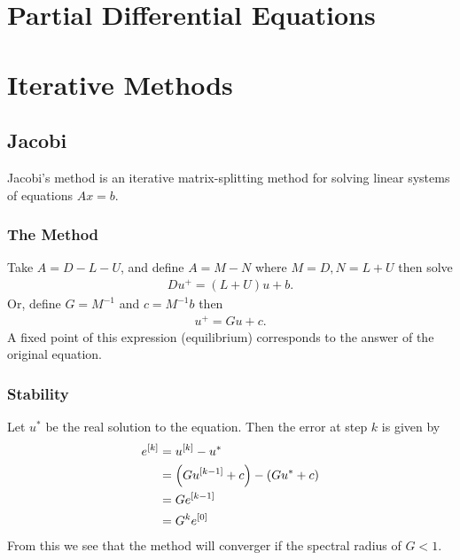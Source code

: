 

\tableofcontents
\section{Partial Differential Equations}
\section{Iterative Methods}
\subsection{Jacobi}
Jacobi's method is an iterative matrix-splitting method for solving linear systems of equations $Ax=b$.
\subsubsection{The Method}
Take $A = D-L-U$, and define $A = M-N$ where $M = D, N = L+U$ then solve
\begin{align}
  Du^+ =  (L+U)u +b.
\end{align}
Or, define $G = M^{-1}$ and $c = M^{-1}b$ then
\begin{align}
  u^+ = Gu+c.
\end{align}
A fixed point of this expression (equilibrium) corresponds to the answer of the original equation.
\subsubsection{Stability}
\label{sec:Jacobi_stab}
Let $u^*$ be the real solution to the equation. Then the error at step $k$ is given by
\begin{align}
  e^{[k]} &= u^{[k]}-u^*\\\nonumber
  &=\left(Gu^{[k-1]}+c\right) - \left(Gu^*+c\right)\\\nonumber
  &=Ge^{[k-1]}\\\nonumber
  &=G^ke^{[0]}
\end{align}
From this we see that the method will converger if the spectral radius of $G < 1$.
